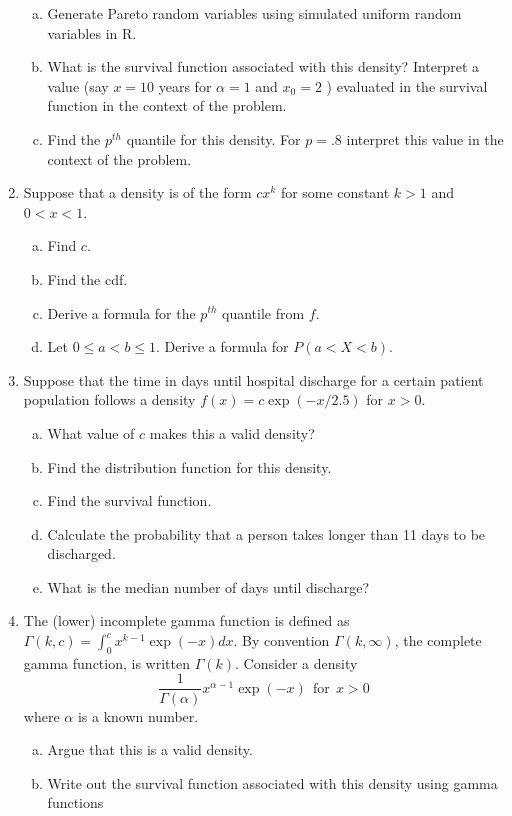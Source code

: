 \documentclass[12pt]{article}
\begin{document}
\begin{enumerate}[Problem 1.]
\begin{enumerate}[a.]
\item Generate Pareto random variables using simulated uniform random variables in R.
\item What is the survival function associated with this density?
  Interpret a value (say $x=10$ years for $\alpha=1$ and $x_0=2$ ) evaluated in the survival function in the context of the problem.
\item Find the $p^{th}$ quantile for this density. For $p=.8$ interpret this
  value in the context of the problem.
\end{enumerate}
\item  Suppose that a density is of the form $cx^k$ for some constant $k > 1$ and $0 < x < 1$.
  \begin{enumerate}[a.]
  \item Find $c$.
  \item Find the cdf.
  \item Derive a formula for the $p^{th}$ quantile from $f$.
  \item Let $0 \leq a < b \leq 1$. Derive a formula for $P(a < X < b)$.
  \end{enumerate}
\item Suppose that the time in days until hospital discharge for a certain patient population
follows a density $f(x) = c\exp(-x/2.5)$ for $x > 0$.
\begin{enumerate}[a.]
    \item What value of $c$ makes this a valid density?
    \item Find the distribution function for this density.
    \item Find the survival function.
    \item Calculate the probability that a person takes longer than 11 days to be discharged.\
    \item What is the median number of days until discharge?
\end{enumerate}
\item The (lower) incomplete gamma function is
    defined as $\Gamma(k, c) = \int_{0}^c x^{k-1}\exp(-x)dx$.
    By convention $\Gamma(k, \infty)$, the complete gamma function, is written $\Gamma(k)$.
    Consider a density
    $$
    \frac{1}{\Gamma(\alpha)} x^{\alpha - 1} \exp(-x) ~~ \mbox{for} ~~ x > 0
    $$
    where $\alpha$ is a known number.
    \begin{enumerate}[a.]
    \item Argue that this is a valid density.
    \item Write out the survival function associated with this density using gamma functions

\end{enumerate}
\end{enumerate}
\end{document}
